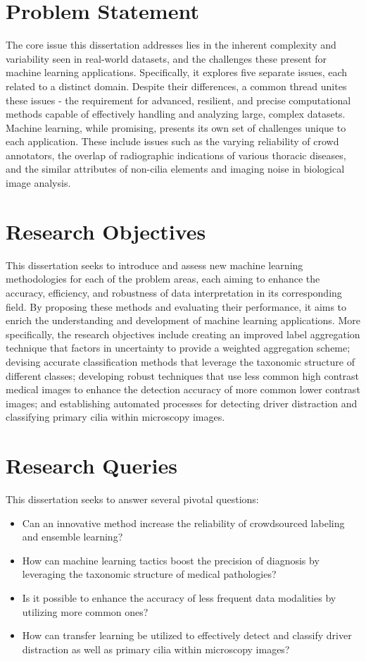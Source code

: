 \section{Problem Statement}
The core issue this dissertation addresses lies in the inherent complexity and variability seen in real-world datasets, and the challenges these present for machine learning applications. Specifically, it explores five separate issues, each related to a distinct domain. Despite their differences, a common thread unites these issues - the requirement for advanced, resilient, and precise computational methods capable of effectively handling and analyzing large, complex datasets. Machine learning, while promising, presents its own set of challenges unique to each application. These include issues such as the varying reliability of crowd annotators, the overlap of radiographic indications of various thoracic diseases, and the similar attributes of non-cilia elements and imaging noise in biological image analysis.
\section{Research Objectives}
This dissertation seeks to introduce and assess new machine learning methodologies for each of the problem areas, each aiming to enhance the accuracy, efficiency, and robustness of data interpretation in its corresponding field. By proposing these methods and evaluating their performance, it aims to enrich the understanding and development of machine learning applications. More specifically, the research objectives include creating an improved label aggregation technique that factors in uncertainty to provide a weighted aggregation scheme; devising accurate classification methods that leverage the taxonomic structure of different classes; developing robust techniques that use less common high contrast medical images to enhance the detection accuracy of more common lower contrast images; and establishing automated processes for detecting driver distraction and classifying primary cilia within microscopy images.
\section{Research Queries}
This dissertation seeks to answer several pivotal questions:
\begin{itemize}
    \item Can an innovative method increase the reliability of crowdsourced labeling and ensemble learning?
    \item How can machine learning tactics boost the precision of diagnosis by leveraging the taxonomic structure of medical pathologies?
    \item Is it possible to enhance the accuracy of less frequent data modalities by utilizing more common ones?
    \item How can transfer learning be utilized to effectively detect and classify driver distraction as well as primary cilia within microscopy images?
\end{itemize}
